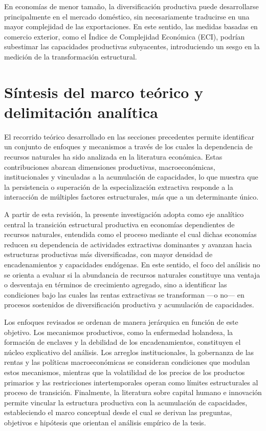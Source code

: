\documentclass[../../PTFM.tex]{subfiles}
\begin{document}
	En economías de menor tamaño, la diversificación productiva puede desarrollarse principalmente en el mercado doméstico, sin necesariamente traducirse en una mayor complejidad de las exportaciones. En este sentido, las medidas basadas en comercio exterior, como el Índice de Complejidad Económica (ECI), podrían subestimar las capacidades productivas subyacentes, introduciendo un sesgo en la medición de la transformación estructural.
	
	\section{Síntesis del marco teórico y delimitación analítica}
	\label{sec:sintesis-marco-teorico}
	
	El recorrido teórico desarrollado en las secciones precedentes permite identificar un conjunto de enfoques y mecanismos a través de los cuales la dependencia de recursos naturales ha sido analizada en la literatura económica. Estas contribuciones abarcan dimensiones productivas, macroeconómicas, institucionales y vinculadas a la acumulación de capacidades, lo que muestra que la persistencia o superación de la especialización extractiva responde a la interacción de múltiples factores estructurales, más que a un determinante único.
	
	A partir de esta revisión, la presente investigación adopta como eje analítico central la transición estructural productiva en economías dependientes de recursos naturales, entendida como el proceso mediante el cual dichas economías reducen su dependencia de actividades extractivas dominantes y avanzan hacia estructuras productivas más diversificadas, con mayor densidad de encadenamientos y capacidades endógenas. En este sentido, el foco del análisis no se orienta a evaluar si la abundancia de recursos naturales constituye una ventaja o desventaja en términos de crecimiento agregado, sino a identificar las condiciones bajo las cuales las rentas extractivas se transforman —o no— en procesos sostenidos de diversificación productiva y acumulación de capacidades.
	
	Los enfoques revisados se ordenan de manera jerárquica en función de este objetivo. Los mecanismos productivos, como la enfermedad holandesa, la formación de enclaves y la debilidad de los encadenamientos, constituyen el núcleo explicativo del análisis. Los arreglos institucionales, la gobernanza de las rentas y las políticas macroeconómicas se consideran condiciones que modulan estos mecanismos, mientras que la volatilidad de los precios de los productos primarios y las restricciones intertemporales operan como límites estructurales al proceso de transición. Finalmente, la literatura sobre capital humano e innovación permite vincular la estructura productiva con la acumulación de capacidades, estableciendo el marco conceptual desde el cual se derivan las preguntas, objetivos e hipótesis que orientan el análisis empírico de la tesis.
	



\end{document}
